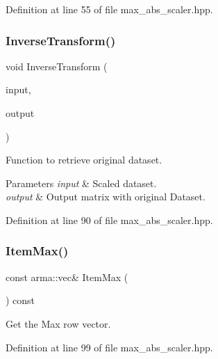 Definition at line 55 of file max\+\_\+abs\+\_\+scaler.\+hpp.

\mbox{\label{classmlpack_1_1data_1_1MaxAbsScaler_afb0e67c6fbf5a527f63469bbbf07066c}} 
\subsubsection{Inverse\+Transform()}
{\footnotesize\ttfamily void Inverse\+Transform (\begin{DoxyParamCaption}\item[{const Mat\+Type \&}]{input,  }\item[{Mat\+Type \&}]{output }\end{DoxyParamCaption})\hspace{0.3cm}{\ttfamily [inline]}}



Function to retrieve original dataset. 


\begin{DoxyParams}{Parameters}
{\em input} & Scaled dataset. \\
\hline
{\em output} & Output matrix with original Dataset. \\
\hline
\end{DoxyParams}


Definition at line 90 of file max\+\_\+abs\+\_\+scaler.\+hpp.

\mbox{\label{classmlpack_1_1data_1_1MaxAbsScaler_a5ed43c216f23cf96c432216d6fc2a1c3}} 
\subsubsection{Item\+Max()}
{\footnotesize\ttfamily const arma\+::vec\& Item\+Max (\begin{DoxyParamCaption}{ }\end{DoxyParamCaption}) const\hspace{0.3cm}{\ttfamily [inline]}}



Get the Max row vector. 



Definition at line 99 of file max\+\_\+abs\+\_\+scaler.\+hpp.

